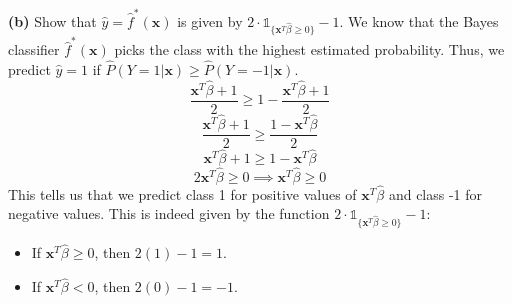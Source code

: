 \textbf{(b)} Show that $\hat{y} = \hat{f}^*(\mathbf{x})$ is given by $2 \cdot \mathds{1}_{\{\mathbf{x}^T\hat{\beta} \ge 0\}} - 1$.
We know that the Bayes classifier $\hat{f}^*(\mathbf{x})$ picks the class with the highest estimated probability. Thus, we predict $\hat{y}=1$ if $\hat{P}(Y=1|\mathbf{x}) \ge \hat{P}(Y=-1|\mathbf{x})$.
\[ \frac{\mathbf{x}^T\hat{\beta} + 1}{2} \ge 1 - \frac{\mathbf{x}^T\hat{\beta} + 1}{2} \]
\[ \frac{\mathbf{x}^T\hat{\beta} + 1}{2} \ge \frac{1 - \mathbf{x}^T\hat{\beta}}{2} \]
\[ \mathbf{x}^T\hat{\beta} + 1 \ge 1 - \mathbf{x}^T\hat{\beta} \]
\[ 2\mathbf{x}^T\hat{\beta} \ge 0 \implies \mathbf{x}^T\hat{\beta} \ge 0 \]
This tells us that we predict class 1 for positive values of $\mathbf{x}^T\hat{\beta}$ and class -1 for negative values.
This is indeed given by the function $2 \cdot \mathds{1}_{\{\mathbf{x}^T\hat{\beta} \ge 0\}} - 1$:
\begin{itemize}
    \item If $\mathbf{x}^T\hat{\beta} \ge 0$, then $2(1) - 1 = 1$.
    \item If $\mathbf{x}^T\hat{\beta} < 0$, then $2(0) - 1 = -1$.
\end{itemize}